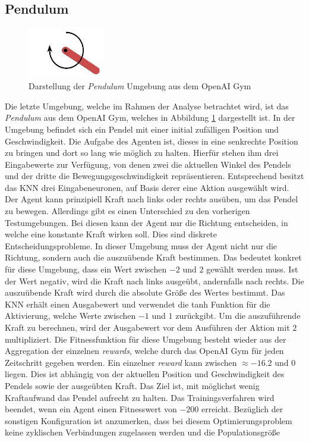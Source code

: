 \subsection{Pendulum}
\label{subsec:analysis_pendulum}
\begin{figure}[!h]
	\centering
	\includegraphics[width=0.3\textwidth]{./img/pendulum_env.JPG} 
	\caption{Darstellung der \emph{Pendulum} Umgebung aus dem OpenAI Gym}
	\label{fig:pendulum_env}
\end{figure}
\noindent
Die letzte Umgebung, welche im Rahmen der Analyse betrachtet wird, ist das \emph{Pendulum} aus dem OpenAI Gym, welches in Abbildung \ref{fig:pendulum_env} dargestellt ist. In der Umgebung befindet sich ein Pendel mit einer initial zufälligen Position und Geschwindigkeit. Die Aufgabe des Agenten ist, dieses in eine senkrechte Position zu bringen und dort so lang wie möglich zu halten. Hierfür stehen ihm drei Eingabewerte zur Verfügung, von denen zwei die aktuellen Winkel des Pendels und der dritte die Bewegungsgeschwindigkeit repräsentieren. Entsprechend besitzt das \ac{KNN} drei Eingabeneuronen, auf Basis derer eine Aktion ausgewählt wird. Der Agent kann prinzipiell Kraft nach links oder rechts ausüben, um das Pendel zu bewegen. Allerdings gibt es einen Unterschied zu den vorherigen Testumgebungen. Bei diesen kann der Agent nur die Richtung entscheiden, in welche eine konstante Kraft wirken soll. Dies sind diskrete Entscheidungsprobleme. In dieser Umgebung muss der Agent nicht nur die Richtung, sondern auch die auszuübende Kraft bestimmen. Das bedeutet konkret für diese Umgebung, dass ein Wert zwischen $-2$ und $2$ gewählt werden muss. Ist der Wert negativ, wird die Kraft nach links ausgeübt, andernfalls nach rechts. Die auszuübende Kraft wird durch die absolute Größe des Wertes bestimmt. Das \ac{KNN} erhält einen Ausgabewert und verwendet die \ac{tanh} Funktion für die Aktivierung, welche Werte zwischen $-1$ und $1$ zurückgibt. Um die auszuführende Kraft zu berechnen, wird der Ausgabewert vor dem Ausführen der Aktion mit $2$ multipliziert. Die Fitnessfunktion für diese Umgebung besteht wieder aus der Aggregation der einzelnen \emph{rewards}, welche durch das OpenAI Gym für jeden Zeitschritt gegeben werden. Ein einzelner \emph{reward} kann zwischen $\approx -16.2$ und $0$ liegen. Dies ist abhängig von der aktuellen Position und Geschwindigkeit des Pendels sowie der ausgeübten Kraft. Das Ziel ist, mit möglichst wenig Kraftaufwand das Pendel aufrecht zu halten. Das Trainingsverfahren wird beendet, wenn ein Agent einen Fitnesswert von $-200$ erreicht. Bezüglich der sonstigen Konfiguration ist anzumerken, dass bei diesem Optimierungsproblem keine zyklischen Verbindungen zugelassen werden und die Populationsgröße 